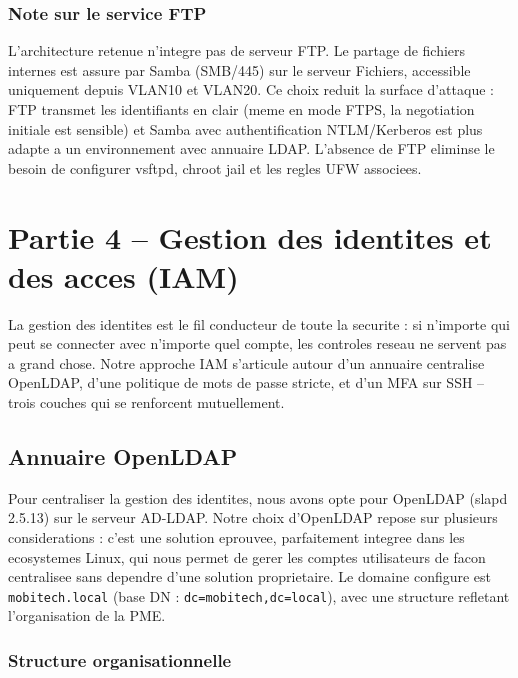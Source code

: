 \documentclass[11pt,a4paper]{article}
\begin{document}
\subsubsection{Note sur le service FTP}

L'architecture retenue n'integre pas de serveur FTP. Le partage de fichiers internes est assure par Samba (SMB/445) sur le serveur Fichiers, accessible uniquement depuis VLAN10 et VLAN20. Ce choix reduit la surface d'attaque : FTP transmet les identifiants en clair (meme en mode FTPS, la negotiation initiale est sensible) et Samba avec authentification NTLM/Kerberos est plus adapte a un environnement avec annuaire LDAP. L'absence de FTP eliminse le besoin de configurer vsftpd, chroot jail et les regles UFW associees.

\section{Partie 4 -- Gestion des identites et des acces (IAM)}

La gestion des identites est le fil conducteur de toute la securite : si n'importe qui peut se connecter avec n'importe quel compte, les controles reseau ne servent pas a grand chose. Notre approche IAM s'articule autour d'un annuaire centralise OpenLDAP, d'une politique de mots de passe stricte, et d'un MFA sur SSH -- trois couches qui se renforcent mutuellement.

\subsection{Annuaire OpenLDAP}

Pour centraliser la gestion des identites, nous avons opte pour OpenLDAP (slapd 2.5.13) sur le serveur AD-LDAP. Notre choix d'OpenLDAP repose sur plusieurs considerations : c'est une solution eprouvee, parfaitement integree dans les ecosystemes Linux, qui nous permet de gerer les comptes utilisateurs de facon centralisee sans dependre d'une solution proprietaire. Le domaine configure est \texttt{mobitech.local} (base DN : \texttt{dc=mobitech,dc=local}), avec une structure refletant l'organisation de la PME.

\subsubsection{Structure organisationnelle}
\end{document}

